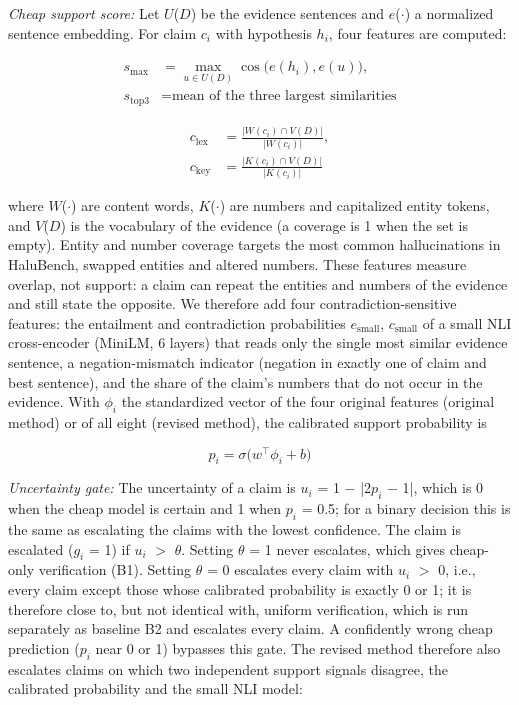 \documentclass[conference]{IEEEtran}
\begin{document}
\textit{Cheap support score:} Let $U$($D$) be the evidence sentences and $e$($\cdot$) a normalized sentence embedding. For claim $c_{i}$ with hypothesis $h_{i}$, four features are computed:

\begin{equation}
\begin{aligned}s_{\max}&=\max_{u\in U(D)}\cos\bigl(e(h_i),e(u)\bigr),\\ s_{\mathrm{top3}}&=\text{mean of the three largest similarities}\end{aligned}
\label{eq:e2}
\end{equation}

\begin{equation}
\begin{aligned}c_{\mathrm{lex}}&=\frac{|W(c_i)\cap V(D)|}{|W(c_i)|},\\ c_{\mathrm{key}}&=\frac{|K(c_i)\cap V(D)|}{|K(c_i)|}\end{aligned}
\label{eq:e3}
\end{equation}

where $W$($\cdot$) are content words, $K$($\cdot$) are numbers and capitalized entity tokens, and $V$($D$) is the vocabulary of the evidence (a coverage is 1 when the set is empty). Entity and number coverage targets the most common hallucinations in HaluBench, swapped entities and altered numbers. These features measure overlap, not support: a claim can repeat the entities and numbers of the evidence and still state the opposite. We therefore add four contradiction-sensitive features: the entailment and contradiction probabilities $e_{\mathrm{small}}$, $c_{\mathrm{small}}$ of a small NLI cross-encoder (MiniLM, 6 layers) that reads only the single most similar evidence sentence, a negation-mismatch indicator (negation in exactly one of claim and best sentence), and the share of the claim's numbers that do not occur in the evidence. With $\phi_{i}$ the standardized vector of the four original features (original method) or of all eight (revised method), the calibrated support probability is

\begin{equation}
p_i=\sigma\bigl(w^{\top}\phi_i+b\bigr)
\label{eq:e4}
\end{equation}

\textit{Uncertainty gate:} The uncertainty of a claim is $u_{i}$ = 1 $-$ |2$p_{i}$ $-$ 1|, which is 0 when the cheap model is certain and 1 when $p_{i}$ = 0.5; for a binary decision this is the same as escalating the claims with the lowest confidence. The claim is escalated ($g_{i}$ = 1) if $u_{i}$ $>$ $\theta$. Setting $\theta$ = 1 never escalates, which gives cheap-only verification (B1). Setting $\theta$ = 0 escalates every claim with $u_{i}$ $>$ 0, i.e., every claim except those whose calibrated probability is exactly 0 or 1; it is therefore close to, but not identical with, uniform verification, which is run separately as baseline B2 and escalates every claim. A confidently wrong cheap prediction ($p_{i}$ near 0 or 1) bypasses this gate. The revised method therefore also escalates claims on which two independent support signals disagree, the calibrated probability and the small NLI model:
\end{document}
